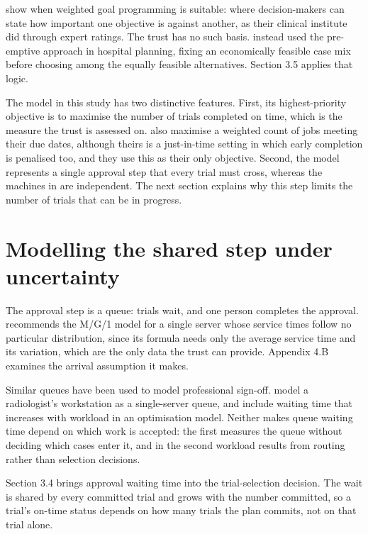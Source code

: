 \citet{Munoz2018ProposalSelection} show when weighted goal programming is suitable: where decision-makers can state how important one objective is against another, as their clinical institute did through expert ratings. The trust has no such basis. \citet{BlakeCarter2002GP} instead used the pre-emptive approach in hospital planning, fixing an economically feasible case mix before choosing among the equally feasible alternatives. Section 3.5 applies that logic.

The model in this study has two distinctive features. First, its highest-priority objective is to maximise the number of trials completed on time, which is the measure the trust is assessed on. \citet{AtsmonyMosheiov2023OnTime} also maximise a weighted count of jobs meeting their due dates, although theirs is a just-in-time setting in which early completion is penalised too, and they use this as their only objective. Second, the model represents a single approval step that every trial must cross, whereas the machines in \citet{AtsmonyMosheiov2023OnTime} are independent. The next section explains why this step limits the number of trials that can be in progress.

\section{Modelling the shared step under uncertainty}
\label{sec:shared}

The approval step is a queue: trials wait, and one person completes the approval. \citet{Gupta2013Queueing} recommends the M/G/1 model for a single server whose service times follow no particular distribution, since its formula needs only the average service time and its variation, which are the only data the trust can provide. Appendix 4.B examines the arrival assumption it makes.

Similar queues have been used to model professional sign-off. \citet{LahiriSeidmann2012HangOvers} model a radiologist's workstation as a single-server queue, and \citet{Svirsko2022Medication} include waiting time that increases with workload in an optimisation model. Neither makes queue waiting time depend on which work is accepted: the first measures the queue without deciding which cases enter it, and in the second workload results from routing rather than selection decisions.

Section 3.4 brings approval waiting time into the trial-selection decision. The wait is shared by every committed trial and grows with the number committed, so a trial's on-time status depends on how many trials the plan commits, not on that trial alone.

